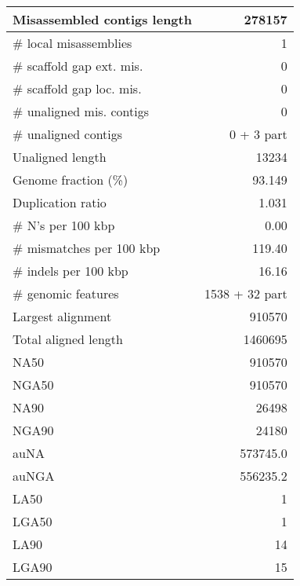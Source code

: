 \documentclass[12pt,a4paper]{article}
\begin{document}
\begin{table}[ht]
\begin{center}
\begin{tabular}{|l*{1}{|r}|}
Misassembled contigs length & 278157 \\ \hline
\# local misassemblies & 1 \\ \hline
\# scaffold gap ext. mis. & 0 \\ \hline
\# scaffold gap loc. mis. & 0 \\ \hline
\# unaligned mis. contigs & 0 \\ \hline
\# unaligned contigs & 0 + 3 part \\ \hline
Unaligned length & 13234 \\ \hline
Genome fraction (\%) & 93.149 \\ \hline
Duplication ratio & 1.031 \\ \hline
\# N's per 100 kbp & 0.00 \\ \hline
\# mismatches per 100 kbp & 119.40 \\ \hline
\# indels per 100 kbp & 16.16 \\ \hline
\# genomic features & 1538 + 32 part \\ \hline
Largest alignment & 910570 \\ \hline
Total aligned length & 1460695 \\ \hline
NA50 & 910570 \\ \hline
NGA50 & 910570 \\ \hline
NA90 & 26498 \\ \hline
NGA90 & 24180 \\ \hline
auNA & 573745.0 \\ \hline
auNGA & 556235.2 \\ \hline
LA50 & 1 \\ \hline
LGA50 & 1 \\ \hline
LA90 & 14 \\ \hline
LGA90 & 15 \\ \hline
\end{tabular}
\end{center}
\end{table}
\end{document}
